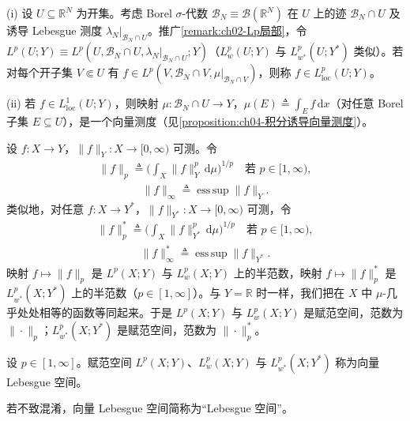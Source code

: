 \documentclass[../../main.tex]{subfiles}%
\begin{document}
\begin{remark}\label{remark:ch04-区域Lp}
(i) 设 $U\subseteq\mathbb{R}^N$ 为开集。考虑 Borel $\sigma$-代数 $\mathcal{B}_N\equiv\mathcal{B}(\mathbb{R}^N)$ 在 $U$ 上的迹 $\mathcal{B}_N\cap U$ 及诱导 Lebesgue 测度 $\lambda_N|_{\mathcal{B}_N\cap U}$。推广\cref{remark:ch02-Lp局部}，令 $L^p(U;Y)\equiv L^p(U,\mathcal{B}_N\cap U,\lambda_N|_{\mathcal{B}_N\cap U};Y)$（$L^p_w(U;Y)$ 与 $L^p_{w^*}(U;Y^*)$ 类似）。若对每个开子集 $V\Subset U$ 有 $f\in L^p(V,\mathcal{B}_N\cap V,\mu|_{\mathcal{B}_N\cap V})$，则称 $f\in L^p_{\mathrm{loc}}(U;Y)$。

(ii) 若 $f\in L^1_{\mathrm{loc}}(U;Y)$，则映射 $\mu:\mathcal{B}_N\cap U\to Y$，$\mu(E)\triangleq \int_E f\,\mathrm{d}x$（对任意 Borel 子集 $E\subseteq U$），是一个向量测度（见\cref{proposition:ch04-积分诱导向量测度}）。
\end{remark}

设 $f:X\to Y$，$\|f\|_Y:X\to[0,\infty)$ 可测。令
\begin{align}
\|f\|_p\triangleq \Big(\int_X\|f\|_Y^p\,\mathrm{d}\mu\Big)^{1/p}\quad\text{若 }p\in[1,\infty), \label{align:ch04-4.65a}
\end{align}
\begin{align}
\|f\|_\infty\triangleq \operatorname*{ess\,sup}\|f\|_Y. \label{align:ch04-4.65b}
\end{align}
类似地，对任意 $f:X\to Y^*$，$\|f\|_{Y^*}:X\to[0,\infty)$ 可测，令
\begin{align}
\|f\|_p^*\triangleq \Big(\int_X\|f\|_{Y^*}^p\,\mathrm{d}\mu\Big)^{1/p}\quad\text{若 }p\in[1,\infty), \label{align:ch04-4.66a}
\end{align}
\begin{align}
\|f\|_\infty^*\triangleq \operatorname*{ess\,sup}\|f\|_{Y^*}. \label{align:ch04-4.66b}
\end{align}
映射 $f\mapsto\|f\|_p$ 是 $L^p(X;Y)$ 与 $L^p_w(X;Y)$ 上的半范数，映射 $f\mapsto\|f\|_p^*$ 是 $L^p_{w^*}(X;Y^*)$ 上的半范数（$p\in[1,\infty]$）。与 $Y=\mathbb{R}$ 时一样，我们把在 $X$ 中 $\mu$-几乎处处相等的函数等同起来。于是 $L^p(X;Y)$ 与 $L^p_w(X;Y)$ 是赋范空间，范数为 $\|\cdot\|_p$；$L^p_{w^*}(X;Y^*)$ 是赋范空间，范数为 $\|\cdot\|_p^*$。

\begin{definition}[向量 Lebesgue 空间]\label{definition:ch04-向量Lebesgue}
设 $p\in[1,\infty]$。赋范空间 $L^p(X;Y)$、$L^p_w(X;Y)$ 与 $L^p_{w^*}(X;Y^*)$ 称为向量 Lebesgue 空间。
\end{definition}

若不致混淆，向量 Lebesgue 空间简称为“Lebesgue 空间”。
\end{document}
